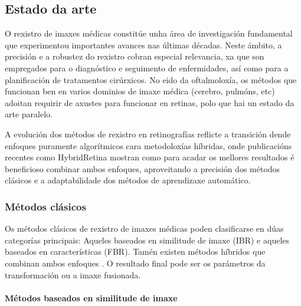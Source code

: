 \subsection{Estado da arte}
\label{subsec:Estado da arte}


O rexistro de imaxes médicas constitúe unha área de investigación fundamental que experimentou importantes avances nas últimas décadas. Neste ámbito, a precisión e a robustez do rexistro cobran especial relevancia, xa que son empregados para o diagnóstico e seguimento de enfermidades, así como para a planificación de tratamentos cirúrxicos.
No eido da oftalmoloxía, os métodos que funcionan ben en varios dominios de imaxe médica (cerebro, pulmóns, etc) adoitan requirir de axustes para funcionar en retinas, polo que hai un estado da arte paralelo. 

A evolución dos métodos de rexistro en retinografías reflicte a transición dende enfoques puramente algorítmicos cara metodoloxías híbridas, onde publicacións recentes como HybridRetina \cite{liu2024progressiveretinalimageregistration}  mostran como para acadar os mellores resultados é beneficioso combinar ambos enfoques, aproveitando a precisión dos métodos clásicos e a adaptabilidade dos métodos de aprendizaxe automático.

\subsubsection{Métodos clásicos}
\label{subsubsec:Métodos clásicos}

Os métodos clásicos de rexistro de imaxes médicas poden clasificarse en dúas categorías principais:
Aqueles baseados en similitude de imaxe (\gls{IBR}) e aqueles baseados en características (\gls{FBR}).
Tamén existen métodos híbridos que combinan ambos enfoques \cite{integrateintfeat}.
O resultado final pode ser os parámetros da transformación ou a imaxe fusionada.

\paragraph{Métodos baseados en similitude de imaxe}
\label{par:Métodos baseados en similitude de imaxe}

